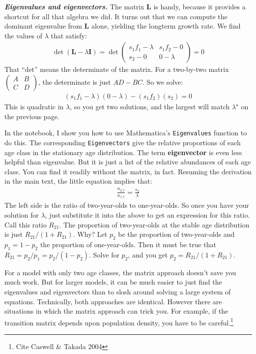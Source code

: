 \documentclass[10pt,reqno]{amsbook}
\newcommand{\bemph}[1]{{\textbf{\textcolor{bemphcol}{#1}}}}
\numberwithin{equation}{chapter}
\newenvironment{mathbox}[2]
{\begin{table}[#1]
\justify\begin{tcolorbox}[enhanced, oversize]\footnotesize\noindent\textbf{\emph{#2}}}
{\end{tcolorbox}\end{table}}
\newcommand{\ttx}[1]{\texttt{#1}}
\begin{document}
\begin{mathbox}{p}{Eigenvalues and eigenvectors.}
The matrix $\mathbf{L}$ is handy, because it provides a shortcut for all that algebra we did. It turns out that we can compute the dominant eigenvalue from $\mathbf L$ alone, yielding the longterm growth rate. %
We find the values of $\lambda$ that satisfy:
\begin{align*}
	\det ( \mathbf L - \lambda \mathbf I ) = \det \! \begin{pmatrix} s_1 f_1 - \lambda & s_1 f_2 - 0 \\ s_2 - 0 & 0 - \lambda \end{pmatrix} = 0
\end{align*}
That ``det'' means the determinate of the matrix. For a two-by-two matrix $\left(\begin{smallmatrix}A & B \\ C & D \end{smallmatrix}\right)$, the determinate is just $AD-BC$. So we solve:
\begin{align*}
	( s_1 f_1 - \lambda )(0 - \lambda) - (s_1 f_2)(s_2) = 0
\end{align*}
This is quadratic in $\lambda$, so you get two solutions, and the largest will match $\lambda^{\!\!\star}$ on the previous page. 

In the notebook, I show you how to use Mathematica's \textcolor{bemphcol}{\ttx{Eigenvalues}} function to do this. The corresponding \textcolor{bemphcol}{\ttx{Eigenvectors}} give the relative proportions of each age class in the stationary age distribution. The term \bemph{eigenvector} is even less helpful than eigenvalue. But it is just a list of the relative abundances of each age class. You can find it readily without the matrix, in fact. Resuming the derivation in the main text, the little equation implies that:
\begin{align*}
	\frac{n_{2,t}}{n_{1,t}} = \frac{s_2}{\lambda}
\end{align*}
The left side is the ratio of two-year-olds to one-year-olds. So once you have your solution for $\lambda$, just substitute it into the above to get an expression for this ratio. Call this ratio $R_{21}$. The proportion of two-year-olds at the stable age distribution is just $R_{21}/(1+R_{21})$. Why? Let $p_2$ be the proportion of two-year-olds and $p_1 = 1 - p_2$ the proportion of one-year-olds. Then it must be true that $R_{21} = {p_2}/{p_1} = {p_2}/({1 - p_2})$. 
Solve for $p_2$, and you get $p_2 = R_{21}/(1+R_{21})$.

For a model with only two age classes, the matrix approach doesn't save you much work. But for larger models, it can be much easier to just find the eigenvalues and eigenvectors than to slosh around solving a large system of equations. Technically, both approaches are identical. However there are situations in which the matrix approach can trick you. For example, if the transition matrix depends upon population density, you have to be careful.\footnote{Cite Caswell \& Takada 2004}
\end{mathbox}
\end{document}
